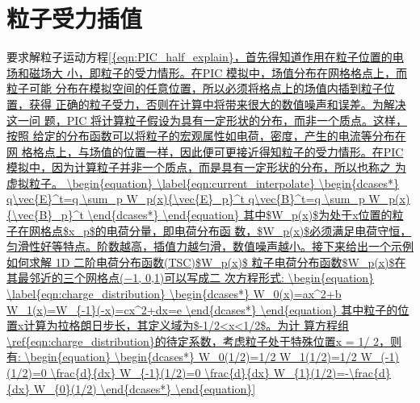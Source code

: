 {\section{粒子受力插值}
要求解粒子运动方程\ref{{eqn:PIC_half_explain}，首先得知道作用在粒子位置的电场和磁场大
小，即粒子的受力情形。在PIC 模拟中，场值分布在网格格点上，而粒子可能
分布在模拟空间的任意位置，所以必须将格点上的场值内插到粒子位置，获得
正确的粒子受力，否则在计算中将带来很大的数值噪声和误差。为解决这一问
题，PIC 将计算粒子假设为具有一定形状的分布，而非一个质点。这样，按照
给定的分布函数可以将粒子的宏观属性如电荷，密度，产生的电流等分布在网
格格点上，与场值的位置一样，因此便可更接近得知粒子的受力情形。在PIC
模拟中，因为计算粒子并非一个质点，而是具有一定形状的分布，所以也称之
为虚拟粒子。

\begin{equation}
\label{eqn:current_interpolate}
\begin{dcases*}

q\vec{E}^t=q \sum_p W_p(x){\vec{E}_p}^t
q\vec{B}^t=q \sum_p W_p(x){\vec{B}_p}^t

\end{dcases*}
\end{equation} 



其中$W_p(x)$为处于x位置的粒子在网格点$x_p$的电荷分量，即电荷分布函
数，$W_p(x)$必须满足电荷守恒，匀滑性好等特点。阶数越高，插值力越匀滑，数值噪声越小。接下来给出一个示例如何求解
1D 二阶电荷分布函数(TSC)$W_p(x)$

粒子电荷分布函数$W_p(x)$在其最邻近的三个网格点(−1, 0,1)可以写成二
次方程形式:

\begin{equation}
\label{eqn:charge_distribution}
\begin{dcases*}


W_0(x)=ax^2+b
W_1(x)=W_{-1}(-x)=cx^2+dx=e


\end{dcases*}
\end{equation} 

其中粒子的位置x计算为拉格朗日步长，其定义域为$-1/2<x<1/2$。为计
算方程组\ref{eqn:charge_distribution}的待定系数，考虑粒子处于特殊位置x = 1/ 2，则有:

\begin{equation}
\begin{dcases*}


W_0(1/2)=1/2
W_1(1/2)=1/2
W_(-1)(1/2)=0
\frac{d}{dx} W_{-1}(1/2)=0
\frac{d}{dx} W_{1}(1/2)=-\frac{d}{dx} W_{0}(1/2)


\end{dcases*}
\end{equation}}}
